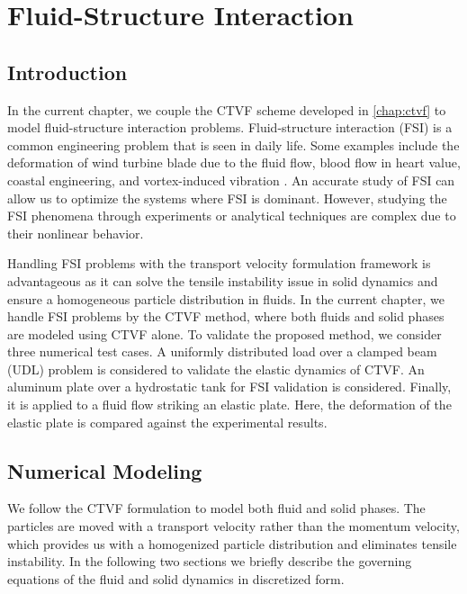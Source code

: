 \chapter{Fluid-Structure Interaction}\label{chap:fsi}
\section{Introduction}
In the current chapter, we couple the CTVF scheme developed in \cref{chap:ctvf}
to model fluid-structure interaction problems. Fluid-structure interaction (FSI)
is a common engineering problem that is seen in daily life. Some examples
include the deformation of wind turbine blade due to the fluid flow, blood flow
in heart value, coastal engineering, and vortex-induced vibration
\citep{williamson2004vortex,bearman2011circular}. An accurate study of FSI can
allow us to optimize the systems where FSI is dominant. However, studying the
FSI phenomena through experiments or analytical techniques are complex due to
their nonlinear behavior.

Handling FSI problems with the transport velocity formulation framework is
advantageous as it can solve the tensile instability issue in solid dynamics and
ensure a homogeneous particle distribution in fluids. In the current chapter, we handle
FSI problems by the CTVF method, where both fluids and solid phases are modeled
using CTVF alone. To validate the proposed method, we consider three numerical
test cases. A uniformly distributed load over a clamped beam (UDL) problem is
considered to validate the elastic dynamics of CTVF. An aluminum plate over a
hydrostatic tank for FSI validation is considered. Finally, it is applied to a
fluid flow striking an elastic plate. Here, the deformation of the elastic plate
is compared against the experimental results.

\section{Numerical Modeling}\label{sec2}
We follow the CTVF formulation to model both fluid and solid phases. The
particles are moved with a transport velocity rather than the momentum velocity,
which provides us with a homogenized particle distribution and eliminates
tensile instability. In the following two sections we briefly describe the
governing equations of the fluid and solid dynamics in discretized form.



